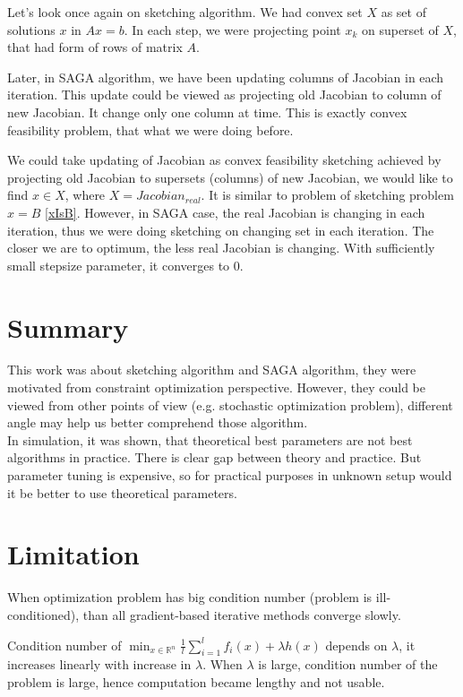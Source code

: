 \documentclass[11pt]{book}
\newcommand{\R}{\mathbb{R}}
\begin{document}
Let's look once again on sketching algorithm. We had convex set $X$ as set of solutions $x$ in $Ax=b$. In each step, we were projecting point $x_k$ on superset of $X$, that had form of rows of matrix $A$.

Later, in SAGA algorithm, we have been updating columns of Jacobian in each iteration. This update could be viewed as projecting old Jacobian to column of new Jacobian. It change only one column at time. This is exactly convex feasibility problem, that what we were doing before.

We could take updating of Jacobian as convex feasibility sketching achieved by projecting old Jacobian to supersets (columns) of new Jacobian, we would like to find $x \in X$, where $X=Jacobian_{real}$. It is similar to problem of sketching problem $x=B$ \ref{xIsB}. However, in SAGA case, the real Jacobian is changing in each iteration, thus we were doing sketching on changing set in each iteration. The closer we are to optimum, the less real Jacobian is changing. With sufficiently small stepsize parameter, it converges to $0$.


\section{Summary}
This work was about sketching algorithm and SAGA algorithm, they were motivated from constraint optimization perspective. However, they could be viewed from other points of view (e.g. stochastic optimization problem), different angle may help us better comprehend those algorithm.\\

In simulation, it was shown, that theoretical best parameters are not best algorithms in practice. There is clear gap between theory and practice. But parameter tuning is expensive, so for practical purposes in unknown setup would it be better to use theoretical parameters.


\section{Limitation}
When optimization problem has big condition number (problem is ill-conditioned), than all gradient-based iterative methods converge slowly.

Condition number of $ \min_{x \in \R^n} \frac{1}{l}\sum_{i=1}^l f_i(x) + \lambda h(x)$ depends on $\lambda$, it increases linearly with increase in $\lambda$. When $\lambda$ is large, condition number of the problem is large, hence computation became lengthy and not usable.
\end{document}
